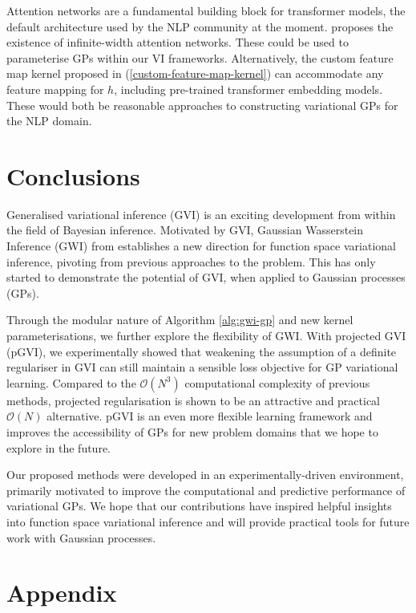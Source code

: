 \documentclass{article}
\numberwithin{equation}{section}
\begin{document}
Attention networks are a fundamental building block for transformer models, the default architecture used by the NLP community at the moment. \cite{pmlr-v119-hron20a} proposes the existence of infinite-width attention networks.
These could be used to parameterise GPs within our VI frameworks.
Alternatively, the custom feature map kernel proposed in (\ref{custom-feature-map-kernel}) can accommodate any feature mapping for $h$, including pre-trained transformer embedding models. 
These would both be reasonable approaches to constructing variational GPs for the NLP domain.

\newpage
\section{Conclusions}\label{section:conclusions}
Generalised variational inference (GVI) is an exciting development from \cite{knoblauch2022optimization} within the field of Bayesian inference.
Motivated by GVI, Gaussian Wasserstein Inference (GWI) from \cite{wild2022generalized} establishes a new direction for function space variational inference, pivoting from previous approaches to the problem.
This has only started to demonstrate the potential of GVI, when applied to Gaussian processes (GPs). 


Through the modular nature of Algorithm \ref{alg:gwi-gp} and new kernel parameterisations, we further explore the flexibility of GWI.
With projected GVI (pGVI), we experimentally showed that weakening the assumption of a definite regulariser in GVI can still maintain a sensible loss objective for GP variational learning.
Compared to the $\mathcal{O}(N^3)$ computational complexity of previous methods, projected regularisation is shown to be an attractive and practical $\mathcal{O}(N)$ alternative. 
pGVI is an even more flexible learning framework and improves the accessibility of GPs for new problem domains that we hope to explore in the future.

Our proposed methods were developed in an experimentally-driven environment, primarily motivated to improve the computational and predictive performance of variational GPs. 
We hope that our contributions have inspired helpful insights into function space variational inference and will provide practical tools for future work with Gaussian processes.


\newpage



\newpage
\appendix
{}
\section{Appendix}
\end{document}
